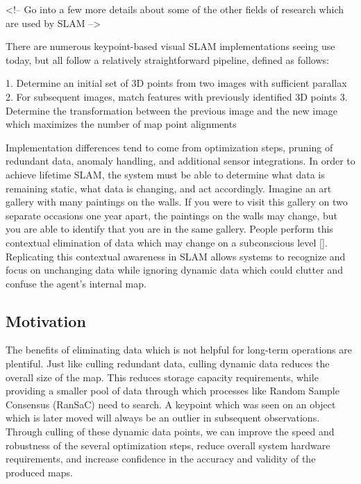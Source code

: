 \documentclass[12pt]{article}
\begin{document}
<!-- Go into a few more details about some of the other fields of research which are used by SLAM -->

There are numerous keypoint-based visual SLAM implementations seeing use today, but all follow a relatively straightforward pipeline, defined as follows:

1. Determine an initial set of 3D points from two images with sufficient parallax
2. For subsequent images, match features with previously identified 3D points
3. Determine the transformation between the previous image and the new image which maximizes the number of map point alignments

Implementation differences tend to come from optimization steps, pruning of redundant data, anomaly handling, and additional sensor integrations. In order to achieve lifetime SLAM, the system must be able to determine what data is remaining static, what data is changing, and act accordingly. Imagine an art gallery with many paintings on the walls. If you were to visit this gallery on two separate occasions one year apart, the paintings on the walls may change, but you are able to identify that you are in the same gallery. People perform this contextual elimination of data which may change on a subconscious level []. Replicating this contextual awareness in SLAM allows systems to recognize and focus on unchanging data while ignoring dynamic data which could clutter and confuse the agent's internal map.

\subsection{Motivation}

The benefits of eliminating data which is not helpful for long-term operations are plentiful. Just like culling redundant data, culling dynamic data reduces the overall size of the map. This reduces storage capacity requirements, while providing a smaller pool of data through which processes like Random Sample Consensus (RanSaC) need to search. A keypoint which was seen on an object which is later moved will always be an outlier in subsequent observations. Through culling of these dynamic data points, we can improve the speed and robustness of the several optimization steps, reduce overall system hardware requirements, and increase confidence in the accuracy and validity of the produced maps.
\end{document}
